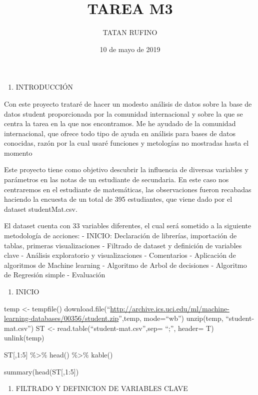 \documentclass[]{article}
\title{TAREA M3}
\author{TATAN RUFINO}
\date{10 de mayo de 2019}
\providecommand{\tightlist}{%
  \setlength{\itemsep}{0pt}\setlength{\parskip}{0pt}}
\begin{document}
\maketitle

\begin{enumerate}
\def\labelenumi{\arabic{enumi}.}
\tightlist
\item
  INTRODUCCIÓN
\end{enumerate}

Con este proyecto trataré de hacer un modesto análisis de datos sobre la
base de datos student proporcionada por la comunidad internacional y
sobre la que se centra la tarea en la que nos encontramos. Me he ayudado
de la comunidad internacional, que ofrece todo tipo de ayuda en análisis
para bases de datos conocidas, razón por la cual usaré funciones y
metologías no mostradas hasta el momento

Este proyecto tiene como objetivo descubrir la influencia de diversas
variables y parámetros en las notas de un estudiante de secundaria. En
este caso nos centraremos en el estudiante de matemáticas, las
observaciones fueron recabadas haciendo la encuesta de un total de 395
estudiantes, que viene dado por el dataset studentMat.csv.

El dataset cuenta con 33 variables diferentes, el cual será sometido a
la siguiente metodología de acciones: - INICIO: Declaración de
librerías, importación de tablas, primeras visualizaciones - Filtrado de
dataset y definición de variables clave - Análisis exploratorio y
visualizaciones - Comentarios - Aplicación de algoritmos de Machine
learning - Algoritmo de Arbol de decisiones - Algoritmo de Regresión
simple - Evaluación

\begin{enumerate}
\def\labelenumi{\arabic{enumi}.}
\setcounter{enumi}{1}
\tightlist
\item
  INICIO
\end{enumerate}

temp \textless{}- tempfile()
download.file(``\url{http://archive.ics.uci.edu/ml/machine-learning-databases/00356/student.zip}'',temp,
mode=``wb'') unzip(temp, ``student-mat.csv'') ST \textless{}-
read.table(``student-mat.csv'',sep= ``;'', header= T) unlink(temp)

ST{[},1:5{]} \%\textgreater{}\% head() \%\textgreater{}\% kable()

summary(head(ST{[},1:5{]})

\begin{enumerate}
\def\labelenumi{\arabic{enumi}.}
\setcounter{enumi}{2}
\tightlist
\item
  FILTRADO Y DEFINICION DE VARIABLES CLAVE
\end{enumerate}
\end{document}
